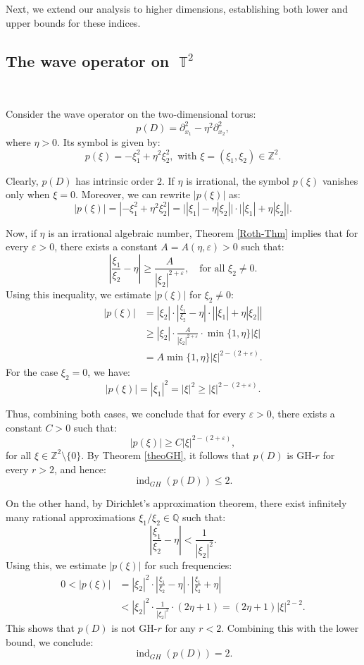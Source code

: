 \documentclass[11pt]{amsart}
\numberwithin{equation}{section}
\theoremstyle{definition}
\DeclareMathOperator{\T}{\mathbb{T}}
\begin{document}
	Next, we extend our analysis to higher dimensions, establishing both lower and upper bounds for these indices. 
	
	\medskip 
\subsection{The wave operator on $\T^2$} \

	Consider the wave operator on the two-dimensional torus:
	\[
	p(D) = \partial_{x_1}^2 - \eta^2 \partial_{x_2}^2,
	\]
	where $\eta > 0$. Its symbol is given by:
	\[
	p(\xi) = -\xi_1^2 + \eta^2 \xi_2^2, \text{ with } \xi = (\xi_1, \xi_2) \in \mathbb{Z}^2.
	\]
	
	Clearly, $p(D)$ has intrinsic order $2$. If $\eta$ is irrational, the symbol $p(\xi)$ vanishes only when $\xi = 0$. Moreover, we can rewrite $|p(\xi)|$ as:
	\[
	|p(\xi)| = |-\xi_1^2 + \eta^2 \xi_2^2| = \big||\xi_1| - \eta |\xi_2|\big| \cdot \big||\xi_1| + \eta |\xi_2|\big|.
	\]
	
	Now, if $\eta$ is an irrational algebraic number, Theorem \ref{Roth-Thm} implies that for every $\varepsilon > 0$, there exists a constant $A = A(\eta, \varepsilon) > 0$ such that:
	\[
	\left|\frac{\xi_1}{\xi_2} - \eta\right| \geq \frac{A}{|\xi_2|^{2+\varepsilon}}, \quad \text{for all } \xi_2 \neq 0.
	\]
	Using this inequality, we estimate $|p(\xi)|$ for $\xi_2 \neq 0$:
	\begin{align*}
		|p(\xi)| &= |\xi_2| \cdot \left|\frac{\xi_1}{\xi_2} - \eta\right| \cdot \left||\xi_1| + \eta |\xi_2|\right| \\
		&\geq |\xi_2| \cdot \frac{A}{|\xi_2|^{2+\varepsilon}} \cdot \min\{1, \eta\} |\xi| \\
		&= A \min\{1, \eta\} |\xi|^{2 - (2 + \varepsilon)}.
	\end{align*}
	For the case $\xi_2 = 0$, we have:
	\[
	|p(\xi)| = |\xi_1|^2 = |\xi|^2 \geq |\xi|^{2 - (2 + \varepsilon)}.
	\]
	
	Thus, combining both cases, we conclude that for every $\varepsilon > 0$, there exists a constant $C > 0$ such that:
	\[
	|p(\xi)| \geq C |\xi|^{2 - (2 + \varepsilon)},
	\]
	for all $\xi \in \mathbb{Z}^2 \setminus \{0\}$. By Theorem \ref{theoGH}, it follows that $p(D)$ is GH-$r$ for every $r > 2$, and hence:
	\[
	\operatorname{ind}_{GH}(p(D)) \leq 2.
	\]
	
	On the other hand, by Dirichlet's approximation theorem, there exist infinitely many rational approximations $\xi_1 / \xi_2 \in \mathbb{Q}$ such that:
	\[
	\left|\frac{\xi_1}{\xi_2} - \eta\right| < \frac{1}{|\xi_2|^2}.
	\]
	Using this, we estimate $|p(\xi)|$ for such frequencies:
	\begin{align*}
		0 < |p(\xi)| &= |\xi_2|^2 \cdot \left|\frac{\xi_1}{\xi_2} - \eta\right| \cdot \left|\frac{\xi_1}{\xi_2} + \eta\right| \\
		&< |\xi_2|^2 \cdot \frac{1}{|\xi_2|^2} \cdot (2\eta + 1) 
		= (2\eta + 1) |\xi|^{2 - 2}.
	\end{align*}
	This shows that $p(D)$ is not GH-$r$ for any $r < 2$. Combining this with the lower bound, we conclude:
	\[
	\operatorname{ind}_{GH}(p(D)) = 2.
	\]
	
\end{document}

